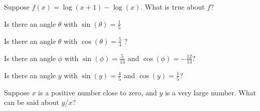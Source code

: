 \documentclass{ximera}
\newcommand{\recommendation}[1]{}
\begin{document}
\begin{shuffle}
\begin{problem}
	Suppose $f(x) = \log(x+1) - \log(x)$.  What is true about $f$?
	\begin{multipleChoice}
  \end{multipleChoice}
\end{problem}

\begin{problem}
	Is there an angle $\theta$ with $\sin(\theta) = \frac{1}{5}$ %
	\begin{multipleChoice}
	\end{multipleChoice}
\end{problem}

\begin{problem}
	Is there an angle $\theta$ with $\cos(\theta) = \frac{5}{4}$ ?
	\begin{multipleChoice}
		\choice{Yes}
		\choice[correct]{No}
	\end{multipleChoice}
\end{problem}

\begin{problem}
	Is there an angle $\phi$ with $\sin(\phi) = \frac{5}{13}$ and $\cos(\phi) = -\frac{12}{13}$?
	\begin{multipleChoice}
		\choice[correct]{Yes}
		\choice{No}
	\end{multipleChoice}
\end{problem}

\begin{problem}
	Is there an angle $y$ with $\sin(y) = \frac{4}{5}$ and $\cos(y) = \frac{1}{5}$?
	\begin{multipleChoice}
	\end{multipleChoice}
\end{problem}



\begin{problem}
  Suppose $x$ is a positive number close to zero, and $y$ is a very large number.  What can be said about $y/x$?
  \begin{multipleChoice}
  \end{multipleChoice}
\end{problem}


\end{shuffle}
\end{document}
